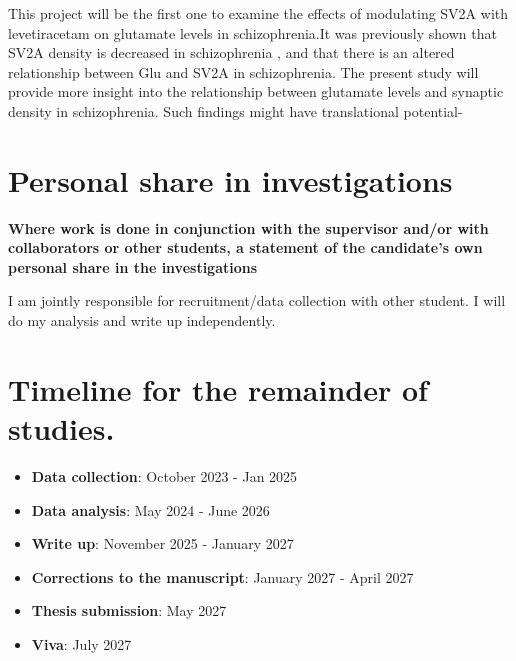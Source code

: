 \documentclass[
  letterpaper,
  DIV=11,
  numbers=noendperiod]{scrartcl}
\providecommand{\tightlist}{%
  \setlength{\itemsep}{0pt}\setlength{\parskip}{0pt}}\usepackage{longtable,booktabs,array}
\begin{document}
This project will be the first one to examine the effects of modulating
SV2A with levetiracetam on glutamate levels in schizophrenia.It was
previously shown that SV2A density is decreased in schizophrenia
\autocite{radhakrishnan_vivo_2021,onwordi_synaptic_2020}, and that there
is an altered relationship between Glu and SV2A in schizophrenia. The
present study will provide more insight into the relationship between
glutamate levels and synaptic density in schizophrenia. Such findings
might have translational potential-

\section{Personal share in
investigations}\label{personal-share-in-investigations}

\textbf{Where work is done in conjunction with the supervisor and/or
with collaborators or other students, a statement of the candidate's own
personal share in the investigations}

I am jointly responsible for recruitment/data collection with other
student. I will do my analysis and write up independently.

\section{Timeline for the remainder of
studies.}\label{timeline-for-the-remainder-of-studies.}

\begin{itemize}
\tightlist
\item
  \textbf{Data collection}: October 2023 - Jan 2025
\item
  \textbf{Data analysis}: May 2024 - June 2026
\item
  \textbf{Write up}: November 2025 - January 2027
\item
  \textbf{Corrections to the manuscript}: January 2027 - April 2027
\item
  \textbf{Thesis submission}: May 2027
\item
  \textbf{Viva}: July 2027
\end{itemize}
\end{document}
